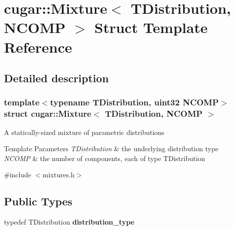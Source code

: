 \hypertarget{structcugar_1_1_mixture}{}\section{cugar\+:\+:Mixture$<$ T\+Distribution, N\+C\+O\+MP $>$ Struct Template Reference}
\label{structcugar_1_1_mixture}


\subsection{Detailed description}
\subsubsection*{template$<$typename T\+Distribution, uint32 N\+C\+O\+MP$>$\newline
struct cugar\+::\+Mixture$<$ T\+Distribution, N\+C\+O\+M\+P $>$}

A statically-\/sized mixture of parametric distributions


\begin{DoxyTemplParams}{Template Parameters}
{\em T\+Distribution} & the underlying distribution type \\
\hline
{\em N\+C\+O\+MP} & the number of components, each of type T\+Distribution \\
\hline
\end{DoxyTemplParams}


{\ttfamily \#include $<$mixtures.\+h$>$}

\subsection*{Public Types}
\begin{DoxyCompactItemize}
\item 
\mbox{\label{structcugar_1_1_mixture_a04a3b1cde4b34d07c4e330ce205515df}} 
typedef T\+Distribution {\bfseries distribution\+\_\+type}
\end{DoxyCompactItemize}

